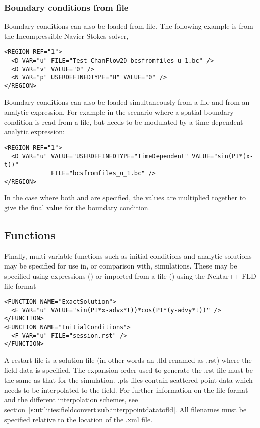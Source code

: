 \subsubsection{Boundary conditions from file}
Boundary conditions can also be loaded from file. The following example is from
the Incompressible Navier-Stokes solver,
\begin{lstlisting}[style=XMLStyle]
<REGION REF="1">
  <D VAR="u" FILE="Test_ChanFlow2D_bcsfromfiles_u_1.bc" />
  <D VAR="v" VALUE="0" />
  <N VAR="p" USERDEFINEDTYPE="H" VALUE="0" />
</REGION>
\end{lstlisting}

Boundary conditions can also be loaded simultaneously from a file and from an 
analytic expression. For example in the scenario where a spatial boundary 
condition is read from a file, but needs to be modulated by a time-dependent 
analytic expression:
\begin{lstlisting}[style=XMLStyle]
<REGION REF="1">
  <D VAR="u" VALUE="USERDEFINEDTYPE="TimeDependent" VALUE="sin(PI*(x-t))"
             FILE="bcsfromfiles_u_1.bc" />
</REGION>
\end{lstlisting}

In the case where both  and  are specified, the values
are multiplied together to give the final value for the boundary condition. 

\subsection{Functions}

Finally, multi-variable functions such as initial conditions and analytic
solutions may be specified for use in, or comparison with, simulations. These
may be specified using expressions () or imported from a file
() using the Nektar++ FLD file format

\begin{lstlisting}[style=XMLStyle]
<FUNCTION NAME="ExactSolution">
  <E VAR="u" VALUE="sin(PI*x-advx*t))*cos(PI*(y-advy*t))" />
</FUNCTION>
<FUNCTION NAME="InitialConditions">
  <F VAR="u" FILE="session.rst" />
</FUNCTION>
\end{lstlisting}

A restart file is a solution file (in other words an .fld renamed as .rst) where
the field data is specified. The expansion order used to generate the .rst file
must be the same as that for the simulation.
.pts files contain scattered point data which needs to be interpolated to the field.
For further information on the file format and the different interpolation schemes, see
section~\ref{s:utilities:fieldconvert:sub:interppointdatatofld}.
All filenames must be specified relative to the location of the .xml file.

